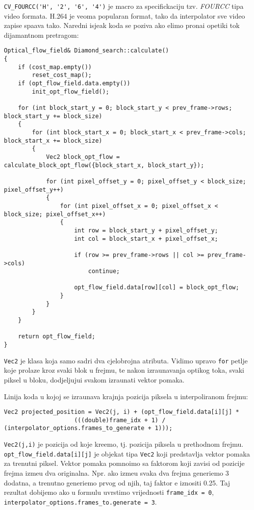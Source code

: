 \lstinline{CV_FOURCC('H', '2', '6', '4')} je macro za specifickaciju tzv. \textit{FOURCC} tipa video formata. H.264 je veoma popularan format, tako da interpolator sve video zapise spa\sh ava tako.
Naredni isje\ch ak koda se poziva ako \zh elimo prona\cj i opeti\ch ki tok dijamantnom pretragom:
\begin{lstlisting}
Optical_flow_field& Diamond_search::calculate()
{
    if (cost_map.empty())
        reset_cost_map();
    if (opt_flow_field.data.empty())
        init_opt_flow_field();

    for (int block_start_y = 0; block_start_y < prev_frame->rows; block_start_y += block_size)
    {
        for (int block_start_x = 0; block_start_x < prev_frame->cols; block_start_x += block_size)
        {
            Vec2 block_opt_flow = calculate_block_opt_flow({block_start_x, block_start_y});

            for (int pixel_offset_y = 0; pixel_offset_y < block_size; pixel_offset_y++)
            {
                for (int pixel_offset_x = 0; pixel_offset_x < block_size; pixel_offset_x++)
                {
                    int row = block_start_y + pixel_offset_y;
                    int col = block_start_x + pixel_offset_x;

                    if (row >= prev_frame->rows || col >= prev_frame->cols)
                        continue;

                    opt_flow_field.data[row][col] = block_opt_flow;
                }
            }
        }
    }

    return opt_flow_field;
}
\end{lstlisting}

\lstinline{Vec2} je klasa koja samo sadr\zh i dva cjelobrojna atributa. Vidimo upravo \lstinline{for} petlje koje prolaze kroz svaki blok u frejmu, te nakon izra\ch unavanja opti\ch kog toka, svaki piksel
u bloku, dodjeljuju\cj i svakom izra\ch unati vektor pomaka.

Linija koda u kojoj se izra\ch unava krajnja pozicija piksela u interpoliranom frejmu:
\begin{lstlisting}
Vec2 projected_position = Vec2(j, i) + (opt_flow_field.data[i][j] *
                    (((double)frame_idx + 1) / (interpolator_options.frames_to_generate + 1)));
\end{lstlisting}

\lstinline{Vec2(j,i)} je pozicija od koje kre\cj emo, tj. pozicija piksela u prethodnom frejmu. \lstinline{opt_flow_field.data[i][j]} je objekat tipa \lstinline{Vec2} koji predstavlja vektor pomaka za trenutni
piksel. Vektor pomaka pomno\zh imo sa faktorom koji zavisi od pozicije frejma izme\dj u dva originalna. Npr. ako izme\dj u svaka dva frejma generi\sh emo 3 dodatna, a trenutno generi\sh emo
prvog od njih, taj faktor \cj e iznositi 0.25. Taj rezultat dobijemo ako u formulu uvrstimo vrijednosti \lstinline{frame_idx = 0}, \lstinline{interpolator_options.frames_to.generate = 3}.

